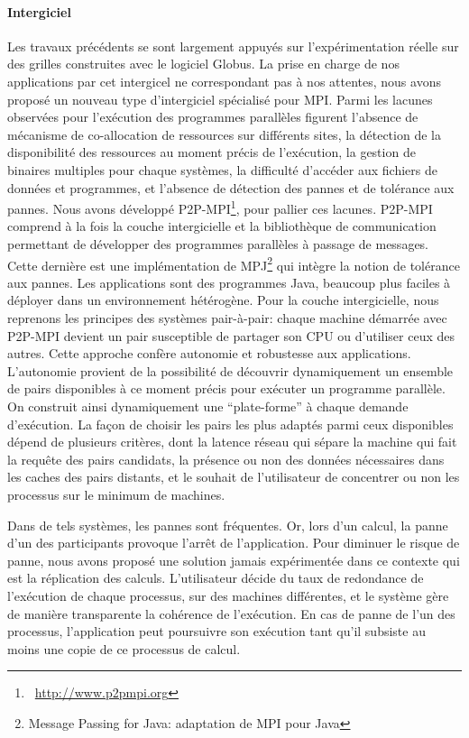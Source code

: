 \documentclass[11pt]{article}
\newcommand{\pmpi}{\mbox{\textsc{P2P-MPI}}}
\begin{document}
\paragraph{Intergiciel}

Les travaux  précédents se sont  largement appuyés sur  l'expérimentation réelle
sur des grilles construites  avec le logiciel Globus. La prise  en charge de nos
applications par cet intergicel ne correspondant  pas à nos attentes, nous avons
proposé un  nouveau type  d'intergiciel spécialisé pour  MPI. Parmi  les lacunes
observées  pour  l'exécution des  programmes  parallèles  figurent l'absence  de
mécanisme de co-allocation  de ressources sur différents sites,  la détection de
la disponibilité des  ressources au moment précis de l'exécution,  la gestion de
binaires multiples pour chaque systèmes, la difficulté d'accéder aux fichiers de
données et programmes, et l'absence de  détection des pannes et de tolérance aux
pannes.  Nous  avons  développé  {\pmpi}\footnote{~\url{http://www.p2pmpi.org}},
pour pallier ces lacunes. {\pmpi} comprend  à la fois la couche intergicielle et
la  bibliothèque  de  communication  permettant  de  développer  des  programmes
parallèles  à passage  de messages.  Cette  dernière est  une implémentation  de
MPJ\footnote{Message Passing for  Java: adaptation de MPI  pour Java} qui intègre
la notion  de tolérance aux pannes.  Les applications sont des  programmes Java,
beaucoup  plus faciles  à déployer  dans un  environnement hétérogène.   Pour la
couche  intergicielle, nous  reprenons les  principes des  systèmes pair-à-pair:
chaque machine démarrée avec {\pmpi} devient un pair susceptible de partager son
CPU  ou  d'utiliser  ceux  des  autres.  Cette  approche  confère  autonomie  et
robustesse aux applications. L'autonomie provient de la possibilité de découvrir
dynamiquement un ensemble de pairs disponibles  à ce moment précis pour exécuter
un programme parallèle.  On construit ainsi dynamiquement  une ``plate-forme'' à
chaque demande d'exécution. La façon de choisir les pairs les plus adaptés parmi
ceux disponibles dépend de plusieurs critères, dont la latence réseau qui sépare
la machine  qui fait  la requête  des pairs  candidats, la  présence ou  non des
données  nécessaires dans  les  caches  des pairs  distants,  et  le souhait  de
l'utilisateur de concentrer ou non les processus sur le minimum de machines.

Dans de  tels systèmes,  les pannes  sont fréquentes. Or,  lors d'un  calcul, la
panne d'un des participants provoque  l'arrêt de l'application. Pour diminuer le
risque de  panne, nous avons  proposé une  solution jamais expérimentée  dans ce
contexte qui  est la réplication  des calculs.  L'utilisateur décide du  taux de
redondance de l'exécution de chaque  processus, sur des machines différentes, et
le système gère  de manière transparente la cohérence de  l'exécution. En cas de
panne de  l'un des processus,  l'application peut poursuivre son  exécution tant
qu'il subsiste au moins une copie de ce processus de calcul.\\
\end{document}
